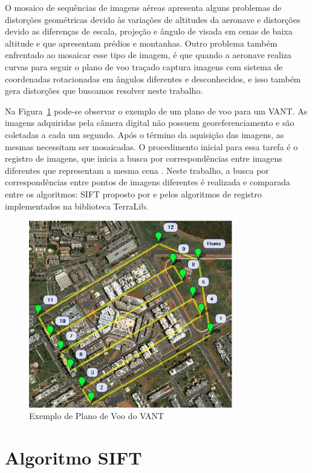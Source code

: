 \documentclass[9pt, a4paper, nofonttune, journal]{IEEEtran}
\begin{document}
O mosaico de sequências de imagens aéreas apresenta alguns problemas de distorções geométricas devido às variações de altitudes da aeronave e 
distorções devido as diferenças de escala, projeção e ângulo de visada em cenas de baixa altitude e que apresentam prédios e montanhas. 
Outro problema também enfrentado ao mosaicar esse tipo de imagem, 
é que quando a aeronave realiza curvas para seguir o plano de voo traçado captura imagens com sistema de coordenadas rotacionadas em ângulos diferentes e desconhecidos, 
e isso também gera distorções que buscamos resolver neste trabalho.

Na Figura~\ref{fig:plano_voo} pode-se observar o exemplo de um plano de voo para um VANT. 
As imagens adquiridas pela câmera digital não possuem georeferenciamento e são coletadas a cada um segundo. 
Após o término da aquisição das imagens, as mesmas necessitam ser mosaicadas. 
O procedimento inicial para essa tarefa é o registro de imagens, que inicia a busca por correspondências entre imagens diferentes que representam a mesma cena \cite{Goltz:08}. 
Neste trabalho, a busca por correspondências entre pontos de imagens diferentes é realizada e comparada entre os algoritmos: SIFT proposto por \cite{Lowe} 
e pelos algoritmos de registro implementados na biblioteca TerraLib.

\begin{figure}[h!t]
  \centering
  \includegraphics[width=3.5in]{figuras/plano_voo}
  \caption{Exemplo de Plano de Voo do VANT}
  \label{fig:plano_voo}
\end{figure}

\section{Algoritmo SIFT}
\end{document}
